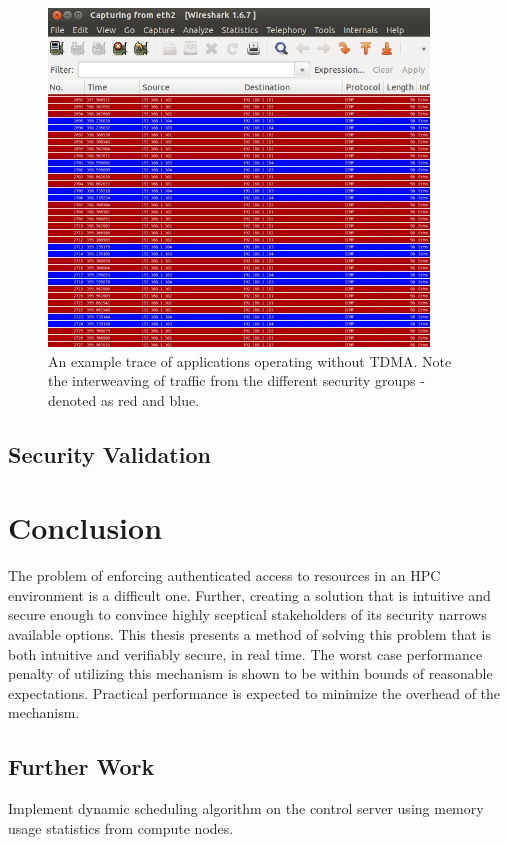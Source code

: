 \documentclass[oneside,12pt]{memoir}
\begin{document}
\begin{figure}
  \begin{center}
    \includegraphics[width=0.9\textwidth]{wireshark_random.jpg}
  \end{center}
  \caption{An example trace of applications operating without TDMA. Note the interweaving of traffic from the different security groups - denoted as red and blue.}
\label{fig:wireshark_random}
\end{figure}

\section{Security Validation}
\chapter{Conclusion}
The problem of enforcing authenticated access to resources in an HPC environment is a difficult one. Further, creating a solution that is intuitive and secure enough to convince highly sceptical stakeholders of its security narrows available options. This thesis presents a method of solving this problem that is both intuitive and verifiably secure, in real time. The worst case performance penalty of utilizing this mechanism is shown to be within bounds of reasonable expectations. Practical performance is expected to minimize the overhead of the mechanism. 
\section{Further Work}
Implement dynamic scheduling algorithm on the control server using memory usage statistics from compute nodes. 
\appendix
\end{document}
